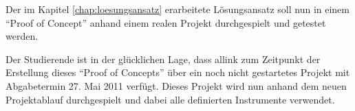 Der im Kapitel \ref{chap:loesungsansatz} erarbeitete Lösungsansatz soll nun
in einem ``Proof of Concept'' anhand einem realen Projekt durchgespielt und getestet
werden.

Der Studierende ist in der glücklichen Lage, dass allink zum Zeitpunkt der
Erstellung dieses ``Proof of Concepts'' über ein noch nicht gestartetes Projekt 
mit Abgabetermin 27. Mai 2011 verfügt. Dieses Projekt wird nun anhand dem neuen
Projektablauf durchgespielt und dabei alle definierten Instrumente verwendet.
